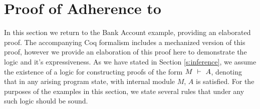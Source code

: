 \section{Proof of Adherence to {{}}}
\label{s:examples}

In this section we return to the Bank Account example, 
providing an elaborated proof. 
The accompanying Coq formalism includes a mechanized version of this proof,
however we provide an elaboration of this proof here to demonstrate the logic
and it's expressiveness.
As we have stated in Section \ref{s:inference}, 
we assume the existence of a logic for constructing proofs
of the form $M\ \vdash\ A$, denoting that in 
any arising program state, with internal module $M$, $A$ is satisfied. 
For the purposes of the examples in this section, we state several 
rules that under any such logic should be sound. 

{\footnotesize
{}
\normalsize}

